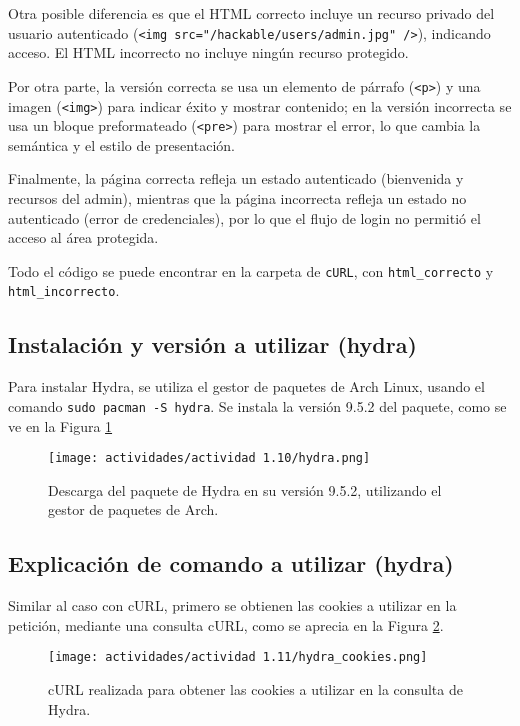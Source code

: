 \documentclass[letter,12pt]{article}
\begin{document}
Otra posible diferencia es que el HTML correcto incluye un recurso privado del usuario autenticado (\texttt{<img src="/hackable/users/admin.jpg" />}), indicando acceso. El HTML incorrecto no incluye ningún recurso protegido.

Por otra parte, la versión correcta se usa un elemento de párrafo (\texttt{<p>}) y una imagen (\texttt{<img>}) para indicar éxito y mostrar contenido; en la versión incorrecta se usa un bloque preformateado (\texttt{<pre>}) para mostrar el error, lo que cambia la semántica y el estilo de presentación.

Finalmente, la página correcta refleja un estado autenticado (bienvenida y recursos del admin), mientras que la página incorrecta refleja un estado no autenticado (error de credenciales), por lo que el flujo de login no permitió el acceso al área protegida.

Todo el código se puede encontrar en la carpeta de \verb|cURL|, con \verb|html_correcto| y \verb|html_incorrecto|.

\subsection{Instalación y versión a utilizar (hydra)}
Para instalar Hydra, se utiliza el gestor de paquetes de Arch Linux, usando el comando \verb|sudo pacman -S hydra|. Se instala la versión 9.5.2 del paquete, como se ve en la Figura \ref{actividad 1.10 hydra}

\begin{figure}[H]
    \centering
    \texttt{[image: actividades/actividad 1.10/hydra.png]}
    \caption{Descarga del paquete de Hydra en su versión 9.5.2, utilizando el gestor de paquetes de Arch.}
    \label{actividad 1.10 hydra}
\end{figure}

\subsection{Explicación de comando a utilizar (hydra)}
Similar al caso con cURL, primero se obtienen las cookies a utilizar en la petición, mediante una consulta cURL, como se aprecia en la Figura \ref{actividad 1.11 hydra_cookies}. 

\begin{figure}[H]
    \centering
    \texttt{[image: actividades/actividad 1.11/hydra\_cookies.png]}
    \caption{cURL realizada para obtener las cookies a utilizar en la consulta de Hydra.}
    \label{actividad 1.11 hydra_cookies}
\end{figure}
\end{document}
